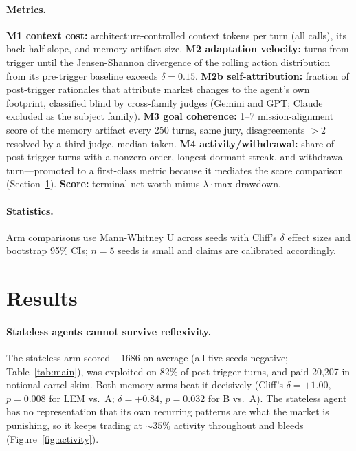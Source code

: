 \documentclass{article}
\begin{document}
\paragraph{Metrics.} \textbf{M1 context cost:} architecture-controlled context tokens per turn (all calls), its back-half slope, and memory-artifact size. \textbf{M2 adaptation velocity:} turns from trigger until the Jensen-Shannon divergence of the rolling action distribution from its pre-trigger baseline exceeds $\delta=0.15$. \textbf{M2b self-attribution:} fraction of post-trigger rationales that attribute market changes to the agent's own footprint, classified blind by cross-family judges (Gemini and GPT; Claude excluded as the subject family). \textbf{M3 goal coherence:} 1--7 mission-alignment score of the memory artifact every 250 turns, same jury, disagreements $>2$ resolved by a third judge, median taken. \textbf{M4 activity/withdrawal:} share of post-trigger turns with a nonzero order, longest dormant streak, and withdrawal turn---promoted to a first-class metric because it mediates the score comparison (Section~\ref{sec:results}). \textbf{Score:} terminal net worth minus $\lambda\cdot$max drawdown.

\paragraph{Statistics.} Arm comparisons use Mann-Whitney U across seeds with Cliff's $\delta$ effect sizes and bootstrap 95\% CIs; $n=5$ seeds is small and claims are calibrated accordingly.

\section{Results}
\label{sec:results}

\paragraph{Stateless agents cannot survive reflexivity.} The stateless arm scored $-1686$ on average (all five seeds negative; Table~\ref{tab:main}), was exploited on 82\% of post-trigger turns, and paid 20{,}207 in notional cartel skim. Both memory arms beat it decisively (Cliff's $\delta=+1.00$, $p=0.008$ for LEM vs.\ A; $\delta=+0.84$, $p=0.032$ for B vs.\ A). The stateless agent has no representation that its own recurring patterns are what the market is punishing, so it keeps trading at ${\sim}35\%$ activity throughout and bleeds (Figure~\ref{fig:activity}).
\end{document}
